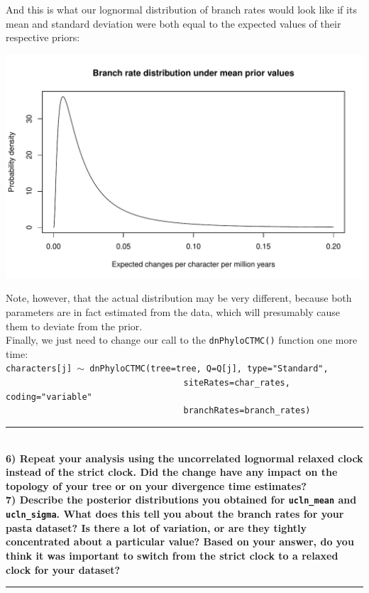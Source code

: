\documentclass[12pt]{article}
\begin{document}
\noindent And this is what our lognormal distribution of branch rates would look like if its mean and standard deviation were both equal to the expected values of their respective priors:

\includegraphics[width=\textwidth]{branchrateprior.pdf}

\noindent Note, however, that the actual distribution may be very different, because both parameters are in fact estimated from the data, which will presumably cause them to deviate from the prior. \\

\noindent Finally, we just need to change our call to the \texttt{dnPhyloCTMC()} function one more time: \\

\indent \texttt{characters[j] {\footnotesize $\sim$} dnPhyloCTMC(tree=tree, Q=Q[j], type="Standard",} \\
\indent \texttt{\ \ \ \ \ \ \ \ \ \ \ \ \ \ \ \ \ \ \ \ \ \ \ \ \ \ \ \ \ \ \ \ \ \ \ siteRates=char\_rates, coding="variable"} \\
\indent \texttt{\ \ \ \ \ \ \ \ \ \ \ \ \ \ \ \ \ \ \ \ \ \ \ \ \ \ \ \ \ \ \ \ \ \ \ branchRates=branch\_rates)}

\vfill

\hrule
\ \\[1ex]
\textbf{6) Repeat your analysis using the uncorrelated lognormal relaxed clock instead of the strict clock. Did the change have any impact on the topology of your tree or on your divergence time estimates?} \\

\noindent \textbf{7) Describe the posterior distributions you obtained for \texttt{ucln\_mean} and \texttt{ucln\_sigma}. What does this tell you about the branch rates for your pasta dataset? Is there a lot of variation, or are they tightly concentrated about a particular value? Based on your answer, do you think it was important to switch from the strict clock to a relaxed clock for your dataset?} \\
\hrule
\end{document}
